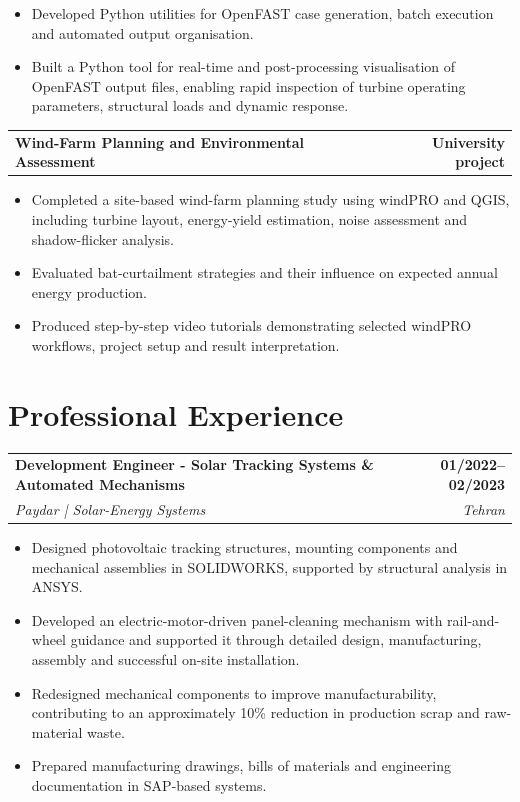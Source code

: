 \documentclass[10pt,a4paper]{article}
\makeatletter
\newcommand{\cvjob}[4]{%
  \begin{tabularx}{\linewidth}{@{}Xr@{}}
    \textbf{#1} & \textbf{#2}\\[1pt]
    \textit{#3} & \textit{#4}
  \end{tabularx}
  \vspace{0.05em}
}
\newcommand{\cvproject}[2]{%
  \begin{tabularx}{\linewidth}{@{}Xr@{}}
    \textbf{#1} & \textbf{#2}
  \end{tabularx}
  \vspace{0.08em}
}
\makeatother
\begin{document}
\begin{itemize}
  \item Developed Python utilities for OpenFAST case generation, batch execution and automated output organisation.

  \item Built a Python tool for real-time and post-processing visualisation of OpenFAST output files, enabling rapid inspection of turbine operating parameters, structural loads and dynamic response.
\end{itemize}
\vspace{1pt}
\cvproject{Wind-Farm Planning and Environmental Assessment}{University project}
\begin{itemize}
  \item Completed a site-based wind-farm planning study using windPRO and QGIS, including turbine layout, energy-yield estimation, noise assessment and shadow-flicker analysis.

  \item Evaluated bat-curtailment strategies and their influence on expected annual energy production.

 \item Produced step-by-step video tutorials demonstrating selected windPRO workflows, project setup and result interpretation.
\end{itemize}

\newpage

\section{Professional Experience}
\cvjob{Development Engineer - Solar Tracking Systems \& Automated Mechanisms}{01/2022--02/2023}{Paydar | Solar-Energy Systems}{Tehran}
\begin{itemize}
  \item Designed photovoltaic tracking structures, mounting components and mechanical assemblies in SOLIDWORKS, supported by structural analysis in ANSYS.
  \item Developed an electric-motor-driven panel-cleaning mechanism with rail-and-wheel guidance and supported it through detailed design, manufacturing, assembly and successful on-site installation.
  \item Redesigned mechanical components to improve manufacturability, contributing to an approximately 10\% reduction in production scrap and raw-material waste.
  \item Prepared manufacturing drawings, bills of materials and engineering documentation in SAP-based systems.
\end{itemize}
\end{document}

